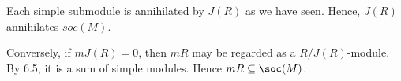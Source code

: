 Each simple submodule is annihilated by $J(R)$ as we have seen. Hence,
$J(R)$ annihilates $soc(M)$.

Conversely, if $mJ(R) = 0$, then $mR$ may be regarded as a $R/J(R)$-module.
By 6.5, it is a sum of simple modules. Hence $mR \subseteq \soc(M)$.
